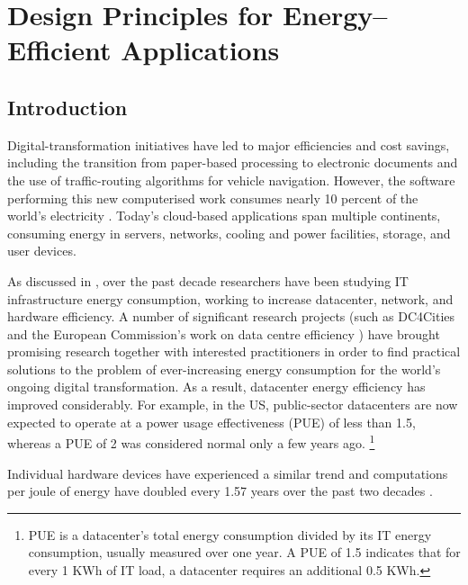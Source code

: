 \chapter{Design Principles for Energy--Efficient Applications}
\label{chapter:energydesignprinciples}


\section{Introduction}

Digital-transformation initiatives have led to major efficiencies and cost savings, including the transition from paper-based processing to electronic documents and the use of traffic-routing algorithms for vehicle navigation. However, the software performing this new computerised work consumes nearly 10 percent of the world's electricity \cite{mills2013-digital-energyusage}. Today's cloud-based applications span multiple continents, consuming energy in servers, networks, cooling and power facilities, storage, and user devices.

As discussed in , over the past decade researchers have been studying IT infrastructure energy consumption, working to increase datacenter, network, and hardware efficiency. A number of significant research projects (such as DC4Cities \cite{dc4cities2014_dcmetrics} and the European Commission's work on data centre efficiency \cite{eu2018-datacentreenergy}) have brought promising research together with interested practitioners in order to find practical solutions to the problem of ever-increasing energy consumption for the world's ongoing digital transformation.  As a result, datacenter energy efficiency has improved considerably. For example, in the US, public-sector datacenters are now expected to operate at a power usage effectiveness (PUE) of less than 1.5, whereas a PUE of 2 was considered normal only a few years ago. \footnote{PUE is a datacenter's total energy consumption divided by its IT energy consumption, usually measured over one year. A PUE of 1.5 indicates that for every 1 KWh of IT load, a datacenter requires an additional 0.5 KWh.}

Individual hardware devices have experienced a similar trend and computations per joule of energy have doubled every 1.57 years over the past two decades \cite{koomey2011-trends-energy-efficiency}. 

